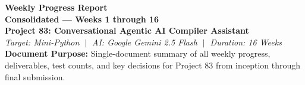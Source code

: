\documentclass[a4paper,11pt]{article}
\begin{document}
\begin{center}
    {\huge \textbf{Weekly Progress Report}} \\
    \vspace{2mm}
    {\Large \textbf{Consolidated --- Weeks 1 through 16}} \\
    \vspace{2mm}
    {\large \textbf{Project 83: Conversational Agentic AI Compiler Assistant}} \\
    \vspace{1mm}
    \textit{Target: Mini-Python $\;|\;$ AI: Google Gemini 2.5 Flash $\;|\;$ Duration: 16 Weeks} \\
    \vspace{3mm}
    \textbf{Document Purpose:} Single-document summary of all weekly progress, deliverables, test counts, and key decisions for Project 83 from inception through final submission.
\end{center}

\vspace{4mm}
\end{document}
